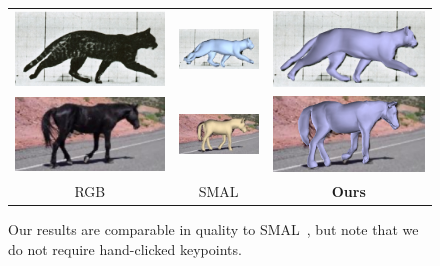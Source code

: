 \begin{figure}[t]
\def\bb{\rule{2in}{0pt}\rule{0pt}{1in}}
\def\bjb{\rule{0.5in}{0pt}\rule{0pt}{0.25in}}
\setlength{\fboxsep}{0pt}%
\centering
\begin{tabular}{ccc}
\includegraphics[width=0.3\linewidth]{smal_comp_cat/rgb_cropped.jpg}
&
\includegraphics[width=0.3\linewidth]{smal_comp_cat/muybridge_107_smal_res_cropped.jpg}
&
\includegraphics[width=0.3\linewidth]{smal_comp_cat/3d_fit_overlay_rgb_cropped.jpg}
\\

\includegraphics[width=0.3\linewidth]{smal_comp_horse/rgb_cropped.jpg} &
\includegraphics[width=0.3\linewidth]{smal_comp_horse/00049424_ferrari_smal_cropped.jpg} &

\includegraphics[width=0.3\linewidth]{smal_comp_horse/3d_fit_overlay_rgb_cropped.jpg} \\

RGB & SMAL \cite{zuffi2017menagerie} & \textbf{Ours}
\end{tabular}
\caption{Our results are comparable in quality to SMAL~\cite{zuffi2017menagerie}, but note that we do not require hand-clicked keypoints.
}
\label{fig:compar_smal}
\end{figure}

